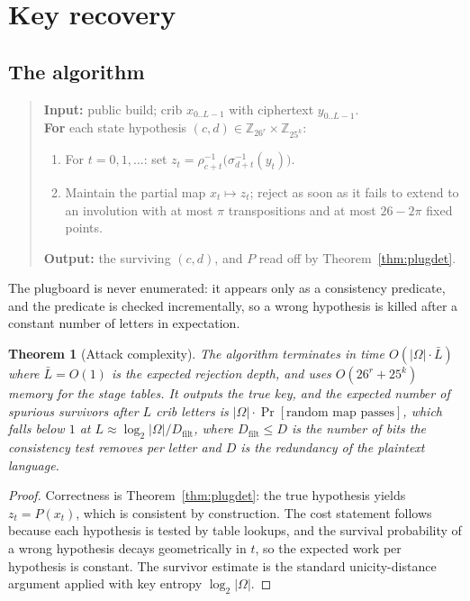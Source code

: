\documentclass[11pt]{article}
\newtheorem{theorem}{Theorem}
\theoremstyle{definition}
\newcommand{\ZZ}{\mathbb{Z}}
\newcommand{\Om}{\Omega}
\begin{document}
\section{Key recovery}\label{sec:attack}

\subsection{The algorithm}

\begin{quote}\small
\textbf{Input:} public build; crib $x_{0..L-1}$ with ciphertext $y_{0..L-1}$.\\
\textbf{For} each state hypothesis $(c,d) \in \ZZ_{26^{r}}\times\ZZ_{25^{k}}$:
\begin{enumerate}[nosep,leftmargin=2em]
\item For $t = 0,1,\dots$: set $z_t = \rho_{c+t}^{-1}\bigl(\sigma_{d+t}^{-1}(y_t)\bigr)$.
\item Maintain the partial map $x_t \mapsto z_t$; reject as soon as it fails to
extend to an involution with at most $\pi$ transpositions and at most
$26-2\pi$ fixed points.
\end{enumerate}
\textbf{Output:} the surviving $(c,d)$, and $P$ read off by Theorem~\ref{thm:plugdet}.
\end{quote}

The plugboard is never enumerated: it appears only as a consistency predicate,
and the predicate is checked incrementally, so a wrong hypothesis is killed
after a constant number of letters in expectation.

\begin{theorem}[Attack complexity]\label{thm:attackcost}
The algorithm terminates in time $O(|\Om|\cdot \bar{L})$ where $\bar{L} = O(1)$
is the expected rejection depth, and uses $O(26^{r} + 25^{k})$ memory for the
stage tables. It outputs the true key, and the expected number of spurious
survivors after $L$ crib letters is $|\Om| \cdot \Pr[\text{random map passes}]$,
which falls below $1$ at $L \approx \log_2|\Om| / D_{\mathrm{filt}}$, where
$D_{\mathrm{filt}} \le D$ is the number of bits the consistency test removes per
letter and $D$ is the redundancy of the plaintext language.
\end{theorem}

\begin{proof}
Correctness is Theorem~\ref{thm:plugdet}: the true hypothesis yields
$z_t = P(x_t)$, which is consistent by construction. The cost statement follows
because each hypothesis is tested by table lookups, and the survival probability
of a wrong hypothesis decays geometrically in $t$, so the expected work per
hypothesis is constant. The survivor estimate is the standard unicity-distance
argument applied with key entropy $\log_2|\Om|$.
\end{proof}
\end{document}
